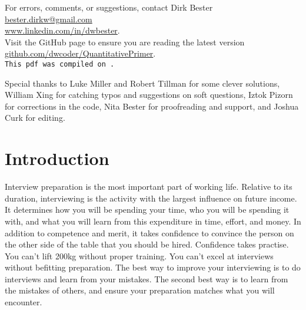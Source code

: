 \documentclass[a4paper]{article}
\begin{document}
\vfill
\begin{center}
For errors, comments, or suggestions, contact Dirk Bester\\
\href{mailto:bester.dirkw@gmail.com}{bester.dirkw@gmail.com}\\
\href{https://www.linkedin.com/in/dwbester}{www.linkedin.com/in/dwbester}.\\
Visit the GitHub page to ensure you are reading the latest version \\
\href{https://github.com/dwcoder/QuantitativePrimer}{github.com/dwcoder/QuantitativePrimer}.\\
\texttt{This pdf was compiled on .} \\
\end{center}

\vfill
\noindent
Special thanks to Luke Miller and Robert Tillman for some clever solutions,
William Xing for catching typos and suggestions on soft questions,
Iztok Pizorn for corrections in the code,
Nita Bester for proofreading and support,
and Joshua Curk for editing.


\clearpage

\setcounter{tocdepth}{2}
\tableofcontents

\clearpage

\renewcommand{\thepage}{\arabic{page}}
\setcounter{page}{1}

{}
\section*{Introduction}

Interview preparation is the most important part of working life.
Relative to its duration, interviewing is the activity with the largest influence on future income.
It determines how you will be spending your time, who you will be spending it with, and what you will learn from this expenditure in time, effort, and money.
In addition to competence and merit, it takes confidence to convince the person on the other side of the table that you should be hired.
Confidence takes practise.
You can't lift 200kg without proper training.
You can't excel at interviews without befitting preparation.
The best way to improve your interviewing is to do interviews and learn from your mistakes.
The second best way is to learn from the mistakes of others, and ensure your preparation matches what you will encounter.
\end{document}
